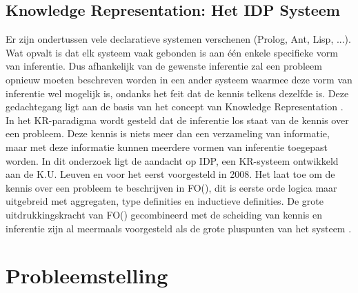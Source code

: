 \subsection{Knowledge Representation: Het IDP Systeem}
Er zijn ondertussen vele declaratieve systemen verschenen (Prolog, Ant, Lisp, ...). Wat opvalt is dat elk systeem vaak gebonden is aan \'{e}\'{e}n enkele specifieke vorm van inferentie. Dus afhankelijk van de gewenste inferentie zal een probleem opnieuw moeten beschreven worden in een ander systeem waarmee deze vorm van inferentie wel mogelijk is, ondanks het feit dat de kennis telkens dezelfde is. Deze gedachtegang ligt aan de basis van het concept van Knowledge Representation \citep{denecker2008building}. In het KR-paradigma wordt gesteld dat de inferentie los staat van de kennis over een probleem. Deze kennis is niets meer dan een verzameling van informatie, maar met deze informatie kunnen meerdere vormen van inferentie toegepast worden. In dit onderzoek ligt de aandacht op IDP, een KR-systeem ontwikkeld aan de K.U. Leuven en voor het eerst voorgesteld in 2008. Het laat toe om de kennis over een probleem te beschrijven in FO(\textperiodcentered), dit is eerste orde logica maar uitgebreid met aggregaten, type definities en inductieve definities. De grote uitdrukkingskracht van FO(\textperiodcentered) gecombineerd met de scheiding van kennis en inferentie zijn al meermaals voorgesteld als de grote pluspunten van het systeem \cite{de2014separating} \cite{van2016kb} \cite{vlaeminck2009logical} \cite{de2014predicate}. 

\section{Probleemstelling}

